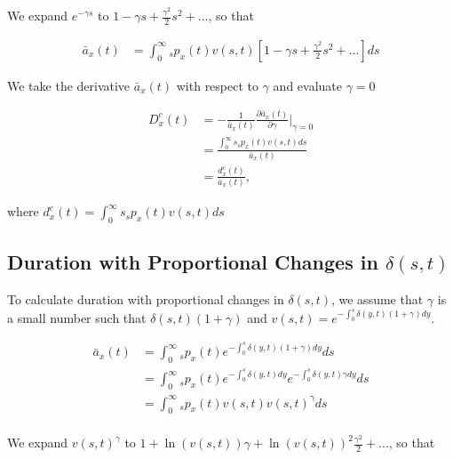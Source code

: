 \documentclass[12pt]{article}
\begin{document}
{We expand $e^{-\gamma s}$ to $1-\gamma s+\frac{\gamma^2}{2} s^{2} +...$, so that


\begin{equation}\label{eq:DurationConst1}
\begin{split}
\bar{a}_{x}(t) &= \int_0^\infty {}_sp_x(t) {v}(s,t)[1-\gamma s+\frac{\gamma^2}{2} s^{2} +...]ds
\end{split}
\end{equation}

We take the derivative $\bar{a}_{x}(t)$ with respect to $\gamma$ and evaluate $\gamma=0$


\begin{equation}\label{eq:DurationConst2}
\begin{split}
{D}^{c}_x(t)&=-\frac{1}{\bar{a}_x(t)}\frac{\partial \bar{a}_x(t)}{\partial \gamma} \bigg\rvert_{\gamma=0}\\
              &= \frac{\int_0^\infty s {}_sp_x(t) {v}(s,t)ds}{\bar{a}_x(t)} \\
              &= \frac{{d}^{c}_x(t)}{\bar{a}_x(t)},
\end{split}
\end{equation}

where ${d}^{c}_x(t)=\int_0^\infty s {}_sp_x(t) {v}(s,t)ds$



\subsection{Duration with Proportional Changes in $\delta(s,t)$} \label{sec:DurProp}

To calculate duration with proportional changes in $\delta(s,t)$, we assume that $\gamma$ is a small number such that $\delta(s,t)(1+\gamma)$ and  ${v}(s,t)=e^{-\int_0^{s}  \delta(y,t)(1+\gamma)dy}$.


\begin{equation}\label{eq:DurationProp1}
\begin{split}
\bar{a} _x(t) &= \int_0^\infty {}_sp_x(t) e^{-\int_0^{s}\delta(y,t)(1+\gamma)dy}ds \\
&= \int_0^\infty {}_sp_x(t) e^{-\int_0^{s}\delta(y,t)dy}e^{-\int_0^{s}\delta(y,t)\gamma dy}ds \\
&= \int_0^\infty {}_sp_x(t) v(s,t)v(s,t)^{\gamma}ds \\
\end{split}
\end{equation}


We expand $v(s,t)^{\gamma}$ to $1+\ln(v(s,t)) \gamma+{\ln(v(s,t))}^2 \frac{\gamma^2}{2}+...$, so that


}
\end{document}
